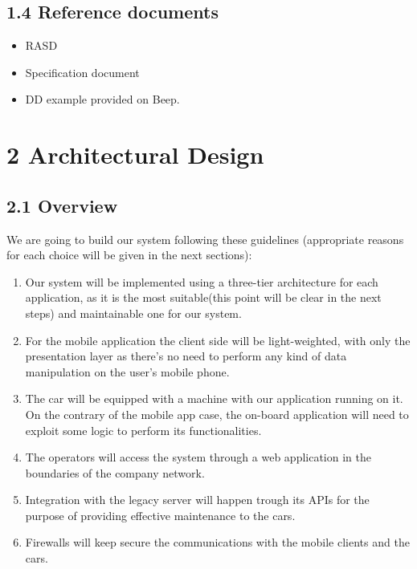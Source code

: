 \documentclass[]{article}
\providecommand{\tightlist}{%
  \setlength{\itemsep}{0pt}\setlength{\parskip}{0pt}}
\begin{document}
\subsection{1.4 Reference documents}\label{reference-documents}

\begin{itemize}
\tightlist
\item
  RASD
\item
  Specification document
\item
  DD example provided on Beep. \newpage
\end{itemize}

\section{2 Architectural Design}\label{architectural-design}

\subsection{2.1 Overview}\label{overview}

We are going to build our system following these guidelines (appropriate
reasons for each choice will be given in the next sections):

\begin{enumerate}
\def\labelenumi{\arabic{enumi}.}
\item
  Our system will be implemented using a three-tier architecture for
  each application, as it is the most suitable(this point will be clear
  in the next steps) and maintainable one for our system.
\item
  For the mobile application the client side will be light-weighted,
  with only the presentation layer as there's no need to perform any
  kind of data manipulation on the user's mobile phone.
\item
  The car will be equipped with a machine with our application running
  on it. On the contrary of the mobile app case, the on-board
  application will need to exploit some logic to perform its
  functionalities.
\item
  The operators will access the system through a web application in the
  boundaries of the company network.
\item
  Integration with the legacy server will happen trough its APIs for the
  purpose of providing effective maintenance to the cars.
\item
  Firewalls will keep secure the communications with the mobile clients
  and the cars.
\end{enumerate}
\end{document}
